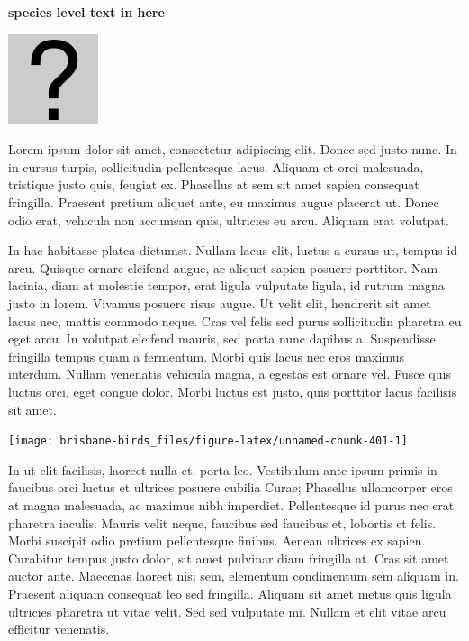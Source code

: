 \documentclass[]{book}
\let\origfigure\figure
\let\endorigfigure\endfigure
\renewenvironment{figure}[1][2] {
  \expandafter\origfigure\expandafter[H]
} {
  \endorigfigure
}
\begin{document}
\textbf{species level text in here}

\begin{figure}
\centering
\includegraphics{assets/missing.png}
\caption{No image for species}
\end{figure}

Lorem ipsum dolor sit amet, consectetur adipiscing elit. Donec sed justo
nunc. In in cursus turpis, sollicitudin pellentesque lacus. Aliquam et
orci malesuada, tristique justo quis, feugiat ex. Phasellus at sem sit
amet sapien consequat fringilla. Praesent pretium aliquet ante, eu
maximus augue placerat ut. Donec odio erat, vehicula non accumsan quis,
ultricies eu arcu. Aliquam erat volutpat.

In hac habitasse platea dictumst. Nullam lacus elit, luctus a cursus ut,
tempus id arcu. Quisque ornare eleifend augue, ac aliquet sapien posuere
porttitor. Nam lacinia, diam at molestie tempor, erat ligula vulputate
ligula, id rutrum magna justo in lorem. Vivamus posuere risus augue. Ut
velit elit, hendrerit sit amet lacus nec, mattis commodo neque. Cras vel
felis sed purus sollicitudin pharetra eu eget arcu. In volutpat eleifend
mauris, sed porta nunc dapibus a. Suspendisse fringilla tempus quam a
fermentum. Morbi quis lacus nec eros maximus interdum. Nullam venenatis
vehicula magna, a egestas est ornare vel. Fusce quis luctus orci, eget
congue dolor. Morbi luctus est justo, quis porttitor lacus facilisis sit
amet.

\begin{figure}
\texttt{[image: brisbane-birds\_files/figure-latex/unnamed-chunk-401-1]} \caption{insert figure caption}\label{fig:unnamed-chunk-401}
\end{figure}

In ut elit facilisis, laoreet nulla et, porta leo. Vestibulum ante ipsum
primis in faucibus orci luctus et ultrices posuere cubilia Curae;
Phasellus ullamcorper eros at magna malesuada, ac maximus nibh
imperdiet. Pellentesque id purus nec erat pharetra iaculis. Mauris velit
neque, faucibus sed faucibus et, lobortis et felis. Morbi suscipit odio
pretium pellentesque finibus. Aenean ultrices ex sapien. Curabitur
tempus justo dolor, sit amet pulvinar diam fringilla at. Cras sit amet
auctor ante. Maecenas laoreet nisi sem, elementum condimentum sem
aliquam in. Praesent aliquam consequat leo sed fringilla. Aliquam sit
amet metus quis ligula ultricies pharetra ut vitae velit. Sed sed
vulputate mi. Nullam et elit vitae arcu efficitur venenatis.
\end{document}
